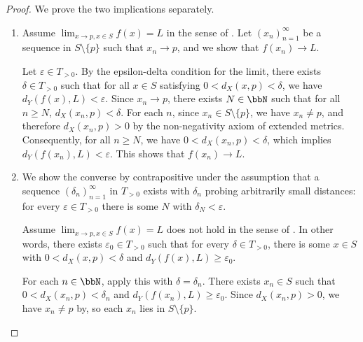 \begin{proof}
    We prove the two implications separately.

    \begin{enumerate}
        \item Assume $\lim_{x \to p, x \in S} f(x) = L$ in the sense of . Let $(x_n)_{n=1}^\infty$ be a sequence in $S \setminus \{p\}$ such that $x_n \to p$, and we show that $f(x_n) \to L$.

        Let $\varepsilon \in T_{>0}$. By the epsilon-delta condition for the limit, there exists $\delta \in T_{>0}$ such that for all $x \in S$ satisfying $0 < d_X(x,p) < \delta$, we have $d_Y(f(x),L) < \varepsilon$. Since $x_n \to p$, there exists $N \in \bbN$ such that for all $n \geq N$, $d_X(x_n, p) < \delta$. For each $n$, since $x_n \in S \setminus \{p\}$, we have $x_n \neq p$, and therefore $d_X(x_n, p) > 0$ by the non-negativity axiom of extended metrics. Consequently, for all $n \geq N$, we have $0 < d_X(x_n, p) < \delta$, which implies $d_Y(f(x_n), L) < \varepsilon$. This shows that $f(x_n) \to L$.

        \item We show the converse by contrapositive under the assumption that a sequence $(\delta_n)_{n=1}^\infty$ in $T_{>0}$ exists with $\delta_n$ probing arbitrarily small distances: for every $\varepsilon \in T_{>0}$ there is some $N$ with $\delta_N < \varepsilon$.

        Assume $\lim_{x \to p, x \in S} f(x) = L$ does not hold in the sense of . In other words, there exists $\varepsilon_0 \in T_{>0}$ such that for every $\delta \in T_{>0}$, there is some $x \in S$ with $0 < d_X(x,p) < \delta$ and $d_Y(f(x),L) \geq \varepsilon_0$.

        For each $n \in \bbN$, apply this with $\delta = \delta_n$. There exists $x_n \in S$ such that $0 < d_X(x_n, p) < \delta_n$ and $d_Y(f(x_n), L) \geq \varepsilon_0$. Since $d_X(x_n, p) > 0$, we have $x_n \neq p$ by, so each $x_n$ lies in $S \setminus \{p\}$.


\end{enumerate}
\end{proof}

